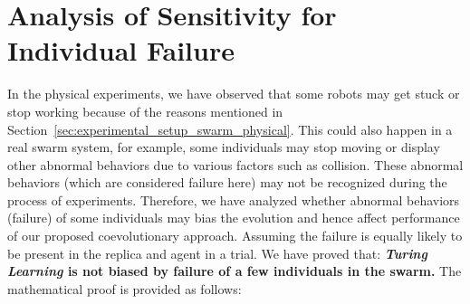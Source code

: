 \section{Analysis of Sensitivity for Individual Failure}\label{sec:analysis_algorithm}

In the physical experiments, we have observed that some robots may get stuck or stop working because of the reasons mentioned in Section~\ref{sec:experimental_setup_swarm_physical}. This could also happen in a real swarm system, for example, some individuals may stop moving or display other abnormal behaviors due to various factors such as collision. These abnormal behaviors (which are considered failure here) may not be recognized during the process of experiments. Therefore, we have analyzed whether abnormal behaviors (failure) of some individuals may bias the evolution and hence affect performance of our proposed coevolutionary approach. Assuming the failure is equally likely to be present in the replica and agent in a trial. We have proved that: \textbf{\textit{Turing Learning} is not biased by failure of a few individuals in the swarm.} The mathematical proof is provided as follows:
 
